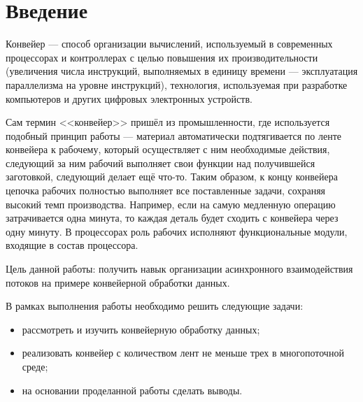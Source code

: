 \chapter*{Введение}

Конвейер — способ организации вычислений, используемый в современных процессорах и контроллерах с целью повышения их производительности (увеличения числа инструкций, выполняемых в единицу времени — эксплуатация параллелизма на уровне инструкций), технология, используемая при разработке компьютеров и других цифровых электронных устройств.

Сам термин <<конвейер>> пришёл из промышленности, где используется подобный принцип работы — материал автоматически подтягивается по ленте конвейера к рабочему, который осуществляет с ним необходимые действия, следующий за ним рабочий выполняет свои функции над получившейся заготовкой, следующий делает ещё что-то. Таким образом, к концу конвейера цепочка рабочих полностью выполняет все поставленные задачи, сохраняя высокий темп производства. Например, если на самую медленную операцию затрачивается одна минута, то каждая деталь будет сходить с конвейера через одну минуту. В процессорах роль рабочих исполняют функциональные модули, входящие в состав процессора.

Цель данной работы: получить навык организации асинхронного взаимодействия потоков на примере конвейерной обработки данных.

В рамках выполнения работы необходимо решить следующие задачи:
\begin{itemize}
	\item рассмотреть и изучить конвейерную обработку данных;
	\item реализовать конвейер с количеством лент не меньше трех в многопоточной среде;
	\item на основании проделанной работы сделать выводы.
\end{itemize}
